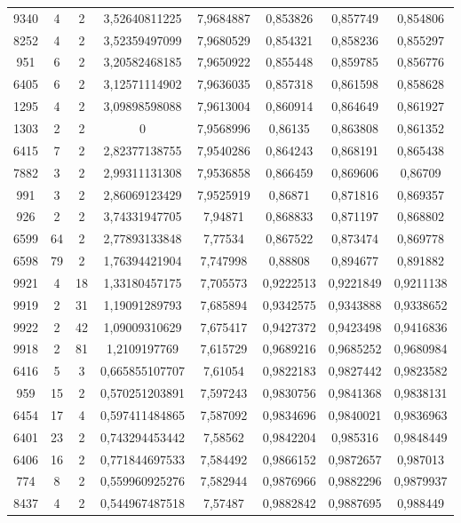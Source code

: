 \begin{longtable}{|c|c|c|c|c|c|c|c|}
9340 & 4 & 2 & 3,52640811225 & 7,9684887 & 0,853826 & 0,857749 & 0,854806 \\
8252 & 4 & 2 & 3,52359497099 & 7,9680529 & 0,854321 & 0,858236 & 0,855297 \\
951 & 6 & 2 & 3,20582468185 & 7,9650922 & 0,855448 & 0,859785 & 0,856776 \\
6405 & 6 & 2 & 3,12571114902 & 7,9636035 & 0,857318 & 0,861598 & 0,858628 \\
1295 & 4 & 2 & 3,09898598088 & 7,9613004 & 0,860914 & 0,864649 & 0,861927 \\
1303 & 2 & 2 & 0 & 7,9568996 & 0,86135 & 0,863808 & 0,861352 \\
6415 & 7 & 2 & 2,82377138755 & 7,9540286 & 0,864243 & 0,868191 & 0,865438 \\
7882 & 3 & 2 & 2,99311131308 & 7,9536858 & 0,866459 & 0,869606 & 0,86709 \\
991 & 3 & 2 & 2,86069123429 & 7,9525919 & 0,86871 & 0,871816 & 0,869357 \\
926 & 2 & 2 & 3,74331947705 & 7,94871 & 0,868833 & 0,871197 & 0,868802 \\
6599 & 64 & 2 & 2,77893133848 & 7,77534 & 0,867522 & 0,873474 & 0,869778 \\
6598 & 79 & 2 & 1,76394421904 & 7,747998 & 0,88808 & 0,894677 & 0,891882 \\
9921 & 4 & 18 & 1,33180457175 & 7,705573 & 0,9222513 & 0,9221849 & 0,9211138 \\
9919 & 2 & 31 & 1,19091289793 & 7,685894 & 0,9342575 & 0,9343888 & 0,9338652 \\
9922 & 2 & 42 & 1,09009310629 & 7,675417 & 0,9427372 & 0,9423498 & 0,9416836 \\
9918 & 2 & 81 & 1,2109197769 & 7,615729 & 0,9689216 & 0,9685252 & 0,9680984 \\
6416 & 5 & 3 & 0,665855107707 & 7,61054 & 0,9822183 & 0,9827442 & 0,9823582 \\
959 & 15 & 2 & 0,570251203891 & 7,597243 & 0,9830756 & 0,9841368 & 0,9838131 \\
6454 & 17 & 4 & 0,597411484865 & 7,587092 & 0,9834696 & 0,9840021 & 0,9836963 \\
6401 & 23 & 2 & 0,743294453442 & 7,58562 & 0,9842204 & 0,985316 & 0,9848449 \\
6406 & 16 & 2 & 0,771844697533 & 7,584492 & 0,9866152 & 0,9872657 & 0,987013 \\
774 & 8 & 2 & 0,559960925276 & 7,582944 & 0,9876966 & 0,9882296 & 0,9879937 \\
8437 & 4 & 2 & 0,544967487518 & 7,57487 & 0,9882842 & 0,9887695 & 0,988449 \\

\end{longtable}
